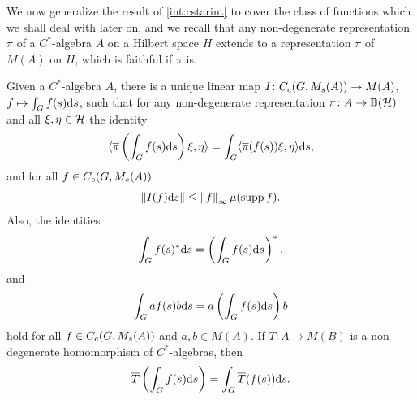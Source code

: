 We now generalize the result of \cref{int:cstarint} to cover the class of functions which we shall deal with later on, and we recall that any non-degenerate representation $\pi$ of a $C^*$-algebra $A$ on a Hilbert space $H$ extends to a representation $\overline \pi$ of $M(A)$ on $H$, which is faithful if $\pi$ is.
\begin{theorem}
Given a $C^*$-algebra $A$, there is a unique linear map $I\colon C_c(G,M_s(A)) \to M(A)$, $f \mapsto \int_G f(s) \mathrm{d} s$, such that for any non-degenerate representation $\pi \colon A \to \mathbb{B}(\mathcal{H})$ and all $\xi, \eta \in \mathcal{H}$ the identity
\begin{align}
	\langle \overline \pi \left( \int_G f(s) \mathrm{d} s \right) \xi , \eta \rangle = \int_{G} \langle \overline \pi(f(s)) \xi , \eta \rangle \mathrm{d} s,
	\label{mult:1.35}
\end{align}
and for all $f \in C_c(G,M_s(A))$
\begin{align}
	\left\lVert I(f) \mathrm{d} s \right\rVert \leq \left\lVert f \right\rVert _{ \infty} \mu(\operatorname{supp} f ).
\end{align}
Also, the identities
\begin{align}
	\int_G f(s) ^* \mathrm{d} s = \left( \int_G f(s) \mathrm{d} s \right)^*,
\end{align}
and
\begin{align}
	\int_G a f(s) b \mathrm{d} s = a \left( \int_G f(s) \mathrm{d} s  \right) b
\end{align}
hold for all $f \in C_c(G,M_s(A))$ and $a,b \in M(A)$. If $T \colon A \to M(B)$ is a non-degenerate homomorphism of $C^*$-algebras, then
\begin{align}
	\overline T \left( \int_G f(s) \mathrm{d} s\right) = \int_G \overline T (f(s)) \mathrm{d} s.
\end{align}

\label{int:multstrictintegral}
\end{theorem}
